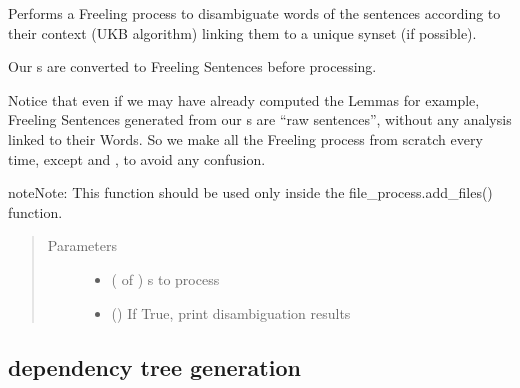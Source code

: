 \documentclass[letterpaper,10pt,english]{sphinxmanual}
\begin{document}
\begin{fulllineitems}
\label{\detokenize{index:loacore.process.synset_process.add_synsets_to_sentences}}
Performs a Freeling process to disambiguate words of the sentences according to their context
(UKB algorithm) linking them to a unique synset (if possible).

Our  s are converted to Freeling Sentences before processing.

Notice that even if we may have already computed the Lemmas for example, Freeling Sentences generated from our
 s are “raw sentences”, without any analysis linked to their Words. So we make all the Freeling
process from scratch every time, except  and , to avoid any confusion.

\begin{sphinxadmonition}{note}{Note:}
This function should be used only inside the file\_process.add\_files() function.
\end{sphinxadmonition}
\begin{quote}\begin{description}
\item[{Parameters}] \leavevmode\begin{itemize}
\item {} 
 ( of ) \textendash{}  s to process

\item {} 
 () \textendash{} If True, print disambiguation results

\end{itemize}

\end{description}\end{quote}

\end{fulllineitems}



\subsection{dependency tree generation}
\label{\detokenize{index:module-loacore.process.deptree_process}}\label{\detokenize{index:dependency-tree-generation}}
\end{document}
